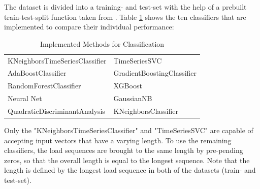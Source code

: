 The dataset is divided into a training- and test-set with the help of a prebuilt train-test-split function taken from \cite{SKlearn}. Table \ref{methods} shows the ten classifiers that are implemented to compare their individual performance:



\begin{table}
	\begin{center}
		\begin{tabular}{ l  l}
			KNeighborsTimeSeriesClassifier \cite{tslearn} & TimeSeriesSVC \cite{tslearn}\\	
			AdaBoostClassifier \cite{SKlearn} & GradientBoostingClassifier \cite{SKlearn} \\ 
			RandomForestClassifier \cite{SKlearn} & XGBoost\cite{XG}\\ 
			Neural Net \cite{SKlearn} & GaussianNB \cite{SKlearn} \\ 
			QuadraticDiscriminantAnalysis \cite{SKlearn} & KNeighborsClassifier \cite{SKlearn} \\ 
		\end{tabular}
		\caption{Implemented Methods for Classification}
		\label{methods}
	\end{center}
	\vspace{-4mm}
\end{table}

Only the "KNeighborsTimeSeriesClassifier" and "TimeSeriesSVC" are capable of accepting input vectors that have a varying length. To use the remaining classifiers, the load sequences are brought to the same length by pre-pending zeros, so that the overall length is equal to the longest sequence. Note that the length is defined by the longest load sequence in both of the datasets (train- and test-set).




